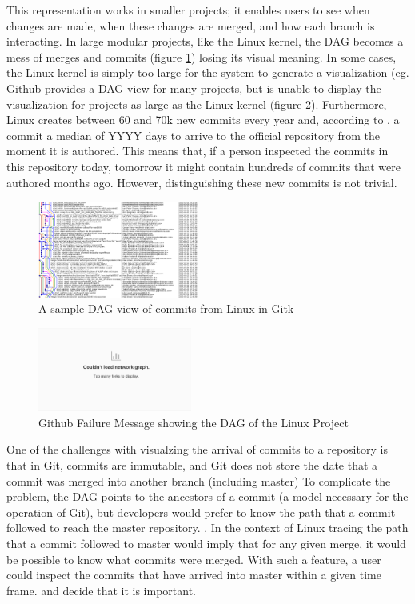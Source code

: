 \documentclass[conference, draftclsnofoot, draft]{IEEEtran}
\begin{document}
This representation works in smaller projects; it enables users to see
when changes are made, when these changes are merged, and how each branch is
interacting.  
In large modular projects, like the Linux kernel, the DAG becomes a
mess of merges and commits (figure \ref{fig:gitk}) losing its visual meaning.  In
some cases, the Linux kernel is simply too large for the system to generate a
visualization (eg. Github provides a DAG view for many projects, but is unable to
display the visualization for projects as large as the Linux kernel (figure
\ref{fig:gitfail}).
Furthermore, Linux creates between 60 and 70k new commits every year and, according to \cite{emsePaper}, 
a commit a median of YYYY days to arrive to the official repository from the moment it is authored. 
This means that, if a person inspected the commits in this repository today, tomorrow it might contain  hundreds
of commits that were authored months ago. However, distinguishing these new commits is not trivial. 

\begin{figure}
        \centering
        \includegraphics[width=0.47\textwidth]{figures/gitk.png}
        \caption{A sample DAG view of commits from Linux in Gitk}
        \label{fig:gitk}
\end{figure}

\begin{figure}
        \centering
        \includegraphics[width=0.45\textwidth]{figures/github_viewer.png}
        \caption{Github Failure Message showing the DAG of the Linux Project}
        \label{fig:gitfail}
\end{figure}


One of the challenges with visualzing the arrival of commits to a repository is that
in Git, commits are immutable, and Git does not store the date that a commit was merged into another branch (including master)
To complicate the problem, the DAG points to the ancestors of a commit (a model necessary for the operation of Git), but developers 
would prefer to know the path that a commit followed to reach the master repository. .
In the context of Linux tracing the path that a commit followed to master would imply that for any given merge, it would be possible to know what commits were merged.
With such a feature,  a user
could inspect the commits that have arrived into master within a given time frame.
 and decide that it is important. 
\end{document}
